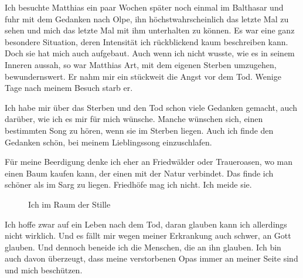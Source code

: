 \documentclass[fontsize=14pt,a4paper,headinclude,DIV=calc,automark]{scrbook}
\begin{document}
Ich besuchte Matthias ein paar Wochen später noch einmal im Balthasar und fuhr mit dem Gedanken nach Olpe, ihn höchstwahrscheinlich das letzte Mal zu sehen und mich das letzte Mal mit ihm unterhalten zu können. Es war eine ganz besondere Situation, deren Intensität ich rückblickend kaum beschreiben kann. Doch sie hat mich auch aufgebaut. Auch wenn ich nicht wusste, wie es in seinem Inneren aussah, so war Matthias Art, mit dem eigenen Sterben umzugehen, bewundernswert. Er nahm mir ein stückweit die Angst vor dem Tod. Wenige Tage nach meinem Besuch starb er.

Ich habe mir über das Sterben und den Tod schon viele Gedanken gemacht, auch darüber, wie ich es mir für mich wünsche. Manche wünschen sich, einen bestimmten Song zu hören, wenn sie im Sterben liegen. Auch ich finde den Gedanken schön, bei meinem Lieblingssong einzuschlafen.

Für meine Beerdigung denke ich eher an Friedwälder oder Traueroasen, wo man einen Baum kaufen kann, der einen mit der Natur verbindet. Das finde ich schöner als im Sarg zu liegen. Friedhöfe mag ich nicht. Ich meide sie. 

\setlength{\fboxsep}{0pt}    %
\setlength{\fboxrule}{0.2pt} %
\begin{figure}[H]
    \centering
    \caption{Ich im Raum der Stille}
    \label{fig:marius_im_raum_der_stille}
\end{figure}

Ich hoffe zwar auf ein Leben nach dem Tod, daran glauben kann ich allerdings nicht wirklich. Und es fällt mir wegen meiner Erkrankung auch schwer, an Gott glauben. Und dennoch beneide ich die Menschen, die an ihn glauben. Ich bin auch davon überzeugt, dass meine verstorbenen Opas immer an meiner Seite sind und mich beschützen.
\end{document}
